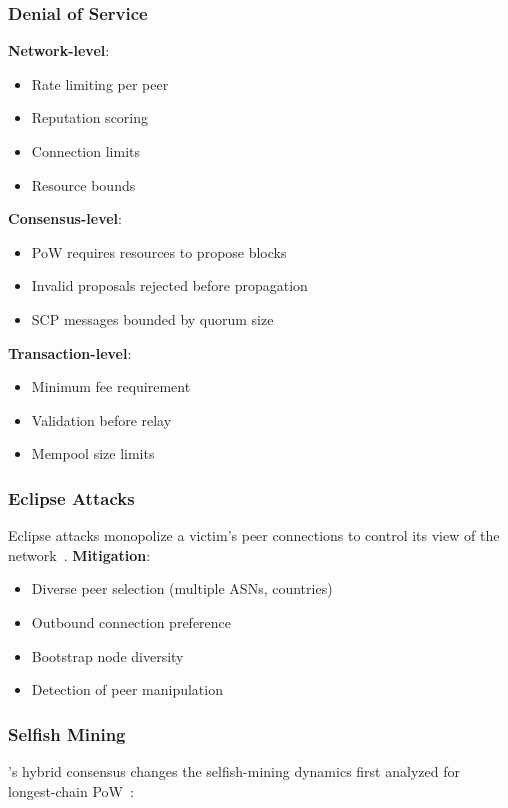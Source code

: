\subsubsection{Denial of Service}

\textbf{Network-level}:
\begin{itemize}
  \item Rate limiting per peer
  \item Reputation scoring
  \item Connection limits
  \item Resource bounds
\end{itemize}

\textbf{Consensus-level}:
\begin{itemize}
  \item PoW requires resources to propose blocks
  \item Invalid proposals rejected before propagation
  \item SCP messages bounded by quorum size
\end{itemize}

\textbf{Transaction-level}:
\begin{itemize}
  \item Minimum fee requirement
  \item Validation before relay
  \item Mempool size limits
\end{itemize}

\subsubsection{Eclipse Attacks}

Eclipse attacks monopolize a victim's peer connections to control its view of
the network~\cite{eclipseattack}. \textbf{Mitigation}:
\begin{itemize}
  \item Diverse peer selection (multiple ASNs, countries)
  \item Outbound connection preference
  \item Bootstrap node diversity
  \item Detection of peer manipulation
\end{itemize}

\subsubsection{Selfish Mining}

\Botho's hybrid consensus changes the selfish-mining dynamics first analyzed
for longest-chain PoW~\cite{selfishmining}:

